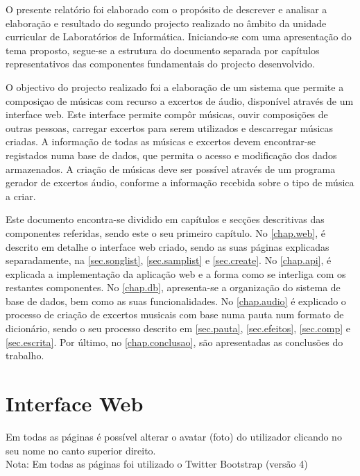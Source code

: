 \documentclass{report}
\begin{document}
O presente relatório foi elaborado com o propósito de descrever e analisar a elaboração e resultado do segundo projecto realizado no âmbito da unidade curricular de Laboratórios de Informática. Iniciando-se com uma apresentação do tema proposto, segue-se a estrutura do documento separada por capítulos representativos das componentes fundamentais do projecto desenvolvido.

O objectivo do projecto realizado foi a elaboração de um sistema que permite a composiçao de músicas com recurso a excertos de áudio, disponível através de um interface web. Este interface permite compôr músicas, ouvir composições de outras pessoas, carregar excertos para serem utilizados e descarregar músicas criadas. A informação de todas as músicas e excertos devem encontrar-se registados numa base de dados, que permita o acesso e modificação dos dados armazenados. A criação de músicas deve ser possível através de um programa gerador de excertos áudio, conforme a informação recebida sobre o tipo de música a criar.

Este documento encontra-se dividido em capítulos e secções descritivas das componentes referidas, sendo este o seu primeiro capítulo. No \autoref{chap.web}, é descrito em detalhe o interface web criado, sendo as suas páginas explicadas separadamente, na \autoref{sec.songlist}, \autoref{sec.samplist} e \autoref{sec.create}. No \autoref{chap.api}, é explicada a implementação da aplicação web e a forma como se interliga com os restantes componentes. No \autoref{chap.db}, apresenta-se a organização do sistema de base de dados, bem como as suas funcionalidades. No \autoref{chap.audio} é explicado o processo de criação de excertos musicais com base numa pauta num formato de dicionário, sendo o seu processo descrito em \autoref{sec.pauta}, \autoref{sec.efeitos}, \autoref{sec.comp} e \autoref{sec.escrita}. Por último, no \autoref{chap.conclusao}, são apresentadas as conclusões do trabalho.


\chapter{Interface Web}
\label{chap.web}

Em todas as páginas é possível alterar o avatar (foto) do utilizador clicando no seu nome no canto superior direito.\\
Nota: Em todas as páginas foi utilizado o Twitter Bootstrap (versão 4)
\end{document}

